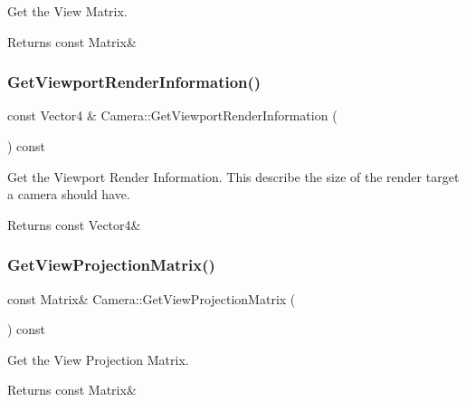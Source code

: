 Get the View Matrix. 

\begin{DoxyReturn}{Returns}
const Matrix\& 
\end{DoxyReturn}
\mbox{\label{classCamera_a055588d001b70381c0d5eaccdf9f7ece}} 
\subsubsection{\texorpdfstring{Get\+Viewport\+Render\+Information()}{GetViewportRenderInformation()}}
{\footnotesize\ttfamily const Vector4 \& Camera\+::\+Get\+Viewport\+Render\+Information (\begin{DoxyParamCaption}{ }\end{DoxyParamCaption}) const}



Get the Viewport Render Information. This describe the size of the render target a camera should have. 

\begin{DoxyReturn}{Returns}
const Vector4\& 
\end{DoxyReturn}
\mbox{\label{classCamera_a2b52161705059c0f182d4d0b62808211}} 
\subsubsection{\texorpdfstring{Get\+View\+Projection\+Matrix()}{GetViewProjectionMatrix()}}
{\footnotesize\ttfamily const Matrix\& Camera\+::\+Get\+View\+Projection\+Matrix (\begin{DoxyParamCaption}{ }\end{DoxyParamCaption}) const\hspace{0.3cm}{\ttfamily [inline]}}



Get the View Projection Matrix. 

\begin{DoxyReturn}{Returns}
const Matrix\& 
\end{DoxyReturn}
\mbox{\label{classCamera_a601c02931f32a0909bba512fb26a7b0c}} 
